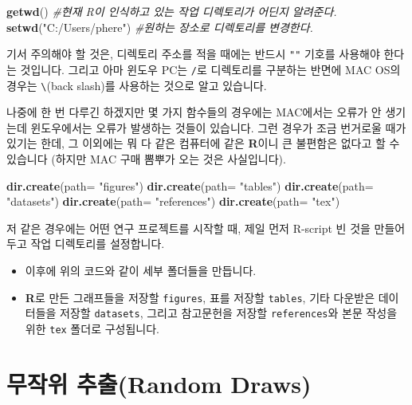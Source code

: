\documentclass[]{book}
\newenvironment{Shaded}{\begin{snugshade}}{\end{snugshade}}
\newcommand{\CommentTok}[1]{\textcolor[rgb]{0.56,0.35,0.01}{\textit{#1}}}
\newcommand{\DataTypeTok}[1]{\textcolor[rgb]{0.13,0.29,0.53}{#1}}
\newcommand{\KeywordTok}[1]{\textcolor[rgb]{0.13,0.29,0.53}{\textbf{#1}}}
\newcommand{\NormalTok}[1]{#1}
\newcommand{\StringTok}[1]{\textcolor[rgb]{0.31,0.60,0.02}{#1}}
\providecommand{\tightlist}{%
  \setlength{\itemsep}{0pt}\setlength{\parskip}{0pt}}
\begin{document}
\begin{Shaded}
\begin{Highlighting}[]
\KeywordTok{getwd}\NormalTok{() }\CommentTok{#현재 R이 인식하고 있는 작업 디렉토리가 어딘지 알려준다.}
\KeywordTok{setwd}\NormalTok{(}\StringTok{"C:/Users/phere"}\NormalTok{) }\CommentTok{#원하는 장소로 디렉토리를 변경한다.}
\end{Highlighting}
\end{Shaded}

기서 주의해야 할 것은, 디렉토리 주소를 적을 때에는 반드시 \texttt{""} 기호를 사용해야 한다는 것입니다. 그리고 아마 윈도우 PC는 \texttt{/}로 디렉토리를 구분하는 반면에 MAC OS의 경우는 \texttt{\textbackslash{}}(back slash)를 사용하는 것으로 알고 있습니다.

나중에 한 번 다루긴 하겠지만 몇 가지 함수들의 경우에는 MAC에서는 오류가 안 생기는데 윈도우에서는 오류가 발생하는 것들이 있습니다. 그런 경우가 조금 번거로울 때가 있기는 한데, 그 이외에는 뭐 다 같은 컴퓨터에 같은 \textbf{R}이니 큰 불편함은 없다고 할 수 있습니다 (하지만 MAC 구매 뽐뿌가 오는 것은 사실입니다).

\begin{Shaded}
\begin{Highlighting}[]
\KeywordTok{dir.create}\NormalTok{(}\DataTypeTok{path=} \StringTok{"figures"}\NormalTok{)}
\KeywordTok{dir.create}\NormalTok{(}\DataTypeTok{path=} \StringTok{"tables"}\NormalTok{)}
\KeywordTok{dir.create}\NormalTok{(}\DataTypeTok{path=} \StringTok{"datasets"}\NormalTok{)}
\KeywordTok{dir.create}\NormalTok{(}\DataTypeTok{path=} \StringTok{"references"}\NormalTok{)}
\KeywordTok{dir.create}\NormalTok{(}\DataTypeTok{path=} \StringTok{"tex"}\NormalTok{)}
\end{Highlighting}
\end{Shaded}

저 같은 경우에는 어떤 연구 프로젝트를 시작할 때, 제일 먼저 R-script 빈 것을 만들어두고 작업 디렉토리를 설정합니다.

\begin{itemize}
\tightlist
\item
  이후에 위의 코드와 같이 세부 폴더들을 만듭니다.
\item
  \textbf{R}로 만든 그래프들을 저장할 \texttt{figures}, 표를 저장할 \texttt{tables}, 기타 다운받은 데이터들을 저장할 \texttt{datasets}, 그리고 참고문헌을 저장할 \texttt{references}와 본문 작성을 위한 \texttt{tex} 폴더로 구성됩니다.
\end{itemize}

\hypertarget{uxbb34uxc791uxc704-uxcd94uxcd9crandom-draws}{%
\section{무작위 추출(Random Draws)}\label{uxbb34uxc791uxc704-uxcd94uxcd9crandom-draws}}
\end{document}
